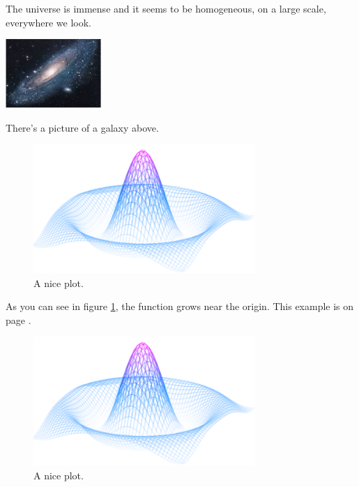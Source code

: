 \documentclass{article}
\begin{document}
The universe is immense and it seems to be homogeneous, on a large scale, everywhere we look.

\includegraphics{universe}  
 
There's a picture of a galaxy above.

\begin{figure}[h]
    \centering
    \includegraphics[width=0.75\textwidth]{mesh}
    \caption{A nice plot.}
    \label{fig:mesh1}
\end{figure}

As you can see in figure \ref{fig:mesh1}, the function grows near the origin. This example is on page \pageref{fig:mesh1}.

\begin{figure}[t]
    \centering
    \includegraphics[width=0.75\textwidth]{mesh}
    \caption{A nice plot.}
\end{figure}
\end{document}
